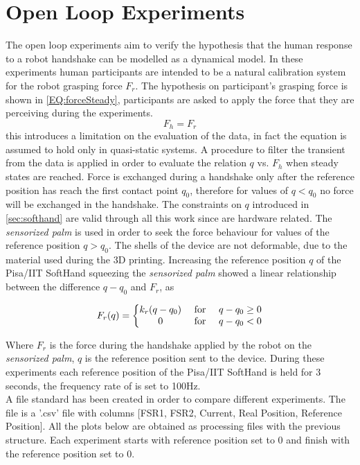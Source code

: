 \chapter{Open Loop Experiments}
The open loop experiments aim to verify the hypothesis that the human response to a robot handshake can be modelled as a dynamical model. In these experiments human participants are intended to be a natural calibration system for the robot grasping force $F_r$. The hypothesis on participant's grasping force is shown in \ref{EQ:forceSteady}, participants are asked to apply the force that they are perceiving during the experiments.
\begin{equation}
F_{h} = F_{r}
\label{EQ:forceSteady}
\end{equation}
this introduces a limitation on the evaluation of the data, in fact the equation is assumed to hold only in quasi-static systems. A procedure to filter the transient from the data is applied in order to evaluate the relation $q$ vs. $F_h$ when steady states are reached.
Force is exchanged during a handshake only after the reference position has reach the first contact point $q_0$, therefore for values of $q < q_0$ no force will be exchanged in the handshake. The constraints on $q$ introduced in \ref{sec:softhand} are valid through all this work since are hardware related.
The \textit{sensorized palm} is used in order to seek the force behaviour for values of the reference position $q > q_0$. The shells of the device are not deformable, due to the material used during the 3D printing. Increasing the reference position $q$ of the Pisa/IIT SoftHand squeezing the \textit{sensorized palm} showed a linear relationship between the difference $q-q_0$ and $F_r$, as	 

\begin{equation}
F_{r}(q)=\left\{\begin{matrix}
k_{r}(q-q_0) & $ for $ &q-q_0 \geq 0 \\ 
0 & $ for $ & q-q_0 < 0
\end{matrix}\right.
\label{EQ:genericForce}
\end{equation}

%

Where $F_r$ is the force during the handshake applied by the robot on the \textit{sensorized palm}, $q$ is the reference position sent to the device.
During these experiments each reference position of the Pisa/IIT SoftHand is held for 3 seconds, the frequency rate of is set to 100Hz. \\
A file standard has been created in order to compare different experiments. The file is a '.csv' file with columns [FSR1, FSR2, Current, Real Position, Reference Position]. All the plots below are obtained as processing files with the previous structure. Each experiment starts with reference position set to 0 and finish with the reference position set to 0. \\

